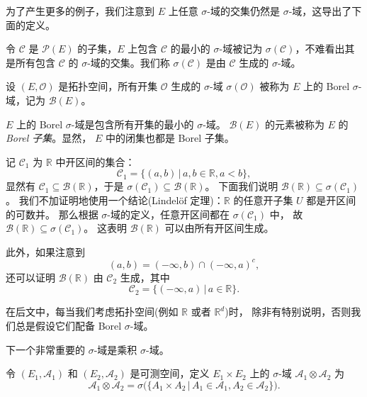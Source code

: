\documentclass[fontset=none]{Notes}
\begin{document}
为了产生更多的例子，我们注意到 $E$ 上任意 $\sigma$-域的交集仍然是
$\sigma$-域，这导出了下面的定义。

\begin{definition}
  令 $\mathcal{C}$ 是 $\mathcal{P}(E)$ 的子集，$E$ 上包含 $\mathcal{C}$
  的最小的 $\sigma$-域被记为 $\sigma(\mathcal{C})$，不难看出其是所有包含 $\mathcal{C}$
  的 $\sigma$-域的交集。我们称 $\sigma(\mathcal{C})$ 是由 $\mathcal{C}$ 生成的
  $\sigma$-域。
\end{definition}

\begin{definition}
  设 $(E,\mathcal{O})$ 是拓扑空间，所有开集 $\mathcal{O}$ 生成的 $\sigma$-域
  $\sigma(\mathcal{O})$ 被称为 $E$ 上的 Borel $\sigma$-域，记为 $\mathcal{B}(E)$。
\end{definition}

$E$ 上的 Borel $\sigma$-域是包含所有开集的最小的 $\sigma$-域。
$\mathcal{B}(E)$ 的元素被称为 $E$ 的\emph{Borel 子集}。显然，
$E$ 中的闭集也都是 Borel 子集。

\begin{example}
  记 $\mathcal{C}_1$ 为 $\mathbb{R}$ 中开区间的集合：
  \[
    \mathcal{C}_1=\{(a,b)\,|\, a,b\in \mathbb{R},a<b\}  ,
  \]
  显然有 $\mathcal{C}_1\subseteq \mathcal{B}(\mathbb{R})$，于是
  $\sigma(\mathcal{C}_1)\subseteq \mathcal{B}(\mathbb{R})$。
  下面我们说明 $\mathcal{B}(\mathbb{R})\subseteq \sigma(\mathcal{C}_1)$。
  我们不加证明地使用一个结论(Lindel\"of 定理)：$\mathbb{R}$ 的任意开子集 $U$ 都是开区间的可数并。
  那么根据 $\sigma$-域的定义，任意开区间都在 $\sigma(\mathcal{C}_1)$ 中，
  故 $\mathcal{B}(\mathbb{R})\subseteq \sigma(\mathcal{C}_1)$。
  这表明 $\mathcal{B}(\mathbb{R})$ 可以由所有开区间生成。

  此外，如果注意到
  \[
    (a,b)=(-\infty,b)\cap (-\infty,a)^c,  
  \]
  还可以证明 $\mathcal{B}(\mathbb{R})$ 由 $\mathcal{C}_2$ 生成，其中
  \[
    \mathcal{C}_2=\{(-\infty,a)\,|\, a\in \mathbb{R}\}.
  \]
\end{example}

在后文中，每当我们考虑拓扑空间(例如 $\mathbb{R}$ 或者 $\mathbb{R}^d$)时，
除非有特别说明，否则我们总是假设它们配备 Borel $\sigma$-域。

下一个非常重要的 $\sigma$-域是乘积 $\sigma$-域。

\begin{definition}
  令 $(E_1,\mathcal{A}_1)$ 和 $(E_2,\mathcal{A}_2)$ 是可测空间，定义
  $E_1\times E_2$ 上的 $\sigma$-域 $\mathcal{A}_1\otimes \mathcal{A}_2$ 为
  \[
    \mathcal{A}_1\otimes \mathcal{A}_2=\sigma\bigl(\{A_1\times A_2\,|\, A_1\in \mathcal{A}_1,A_2\in \mathcal{A}_2\}\bigr).
  \]
\end{definition}
\end{document}
